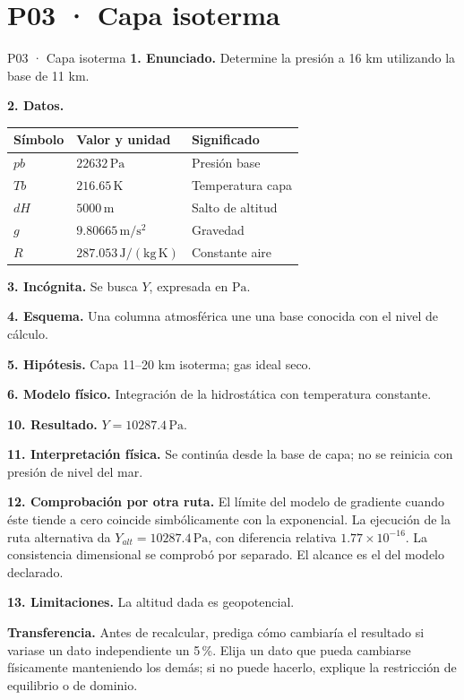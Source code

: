 \chapter*{P03 · Capa isoterma}
\begin{studiumworked}{P03 · Capa isoterma}
\textbf{1. Enunciado.} Determine la presión a 16 km utilizando la base de 11 km.

\textbf{2. Datos.}
\begin{longtable}{p{.16\linewidth}p{.35\linewidth}p{.38\linewidth}}\toprule Símbolo & Valor y unidad & Significado\\\midrule\endhead
$pb$ & $22632\,\mathrm{Pa}$ & Presión base\\
$Tb$ & $216.65\,\mathrm K$ & Temperatura capa\\
$dH$ & $5000\,\mathrm m$ & Salto de altitud\\
$g$ & $9.80665\,\mathrm{m/s^2}$ & Gravedad\\
$R$ & $287.053\,\mathrm{J/(kg\,K)}$ & Constante aire\\
\bottomrule\end{longtable}
\textbf{3. Incógnita.} Se busca $Y$, expresada en $\mathrm{Pa}$.

\textbf{4. Esquema.} Una columna atmosférica une una base conocida con el nivel de cálculo.

\textbf{5. Hipótesis.} Capa 11–20 km isoterma; gas ideal seco.

\textbf{6. Modelo físico.} Integración de la hidrostática con temperatura constante.


\textbf{10. Resultado.} $Y=10287.4\,\mathrm{Pa}$.

\textbf{11. Interpretación física.} Se continúa desde la base de capa; no se reinicia con presión de nivel del mar.

\textbf{12. Comprobación por otra ruta.} El límite del modelo de gradiente cuando éste tiende a cero coincide simbólicamente con la exponencial. La ejecución de la ruta alternativa da $Y_{alt}=10287.4\,\mathrm{Pa}$, con diferencia relativa $1.77\times10^{-16}$. La consistencia dimensional se comprobó por separado. El alcance es el del modelo declarado.

\textbf{13. Limitaciones.} La altitud dada es geopotencial.

\textbf{Transferencia.} Antes de recalcular, prediga cómo cambiaría el resultado si variase un dato independiente un 5\,\%. Elija un dato que pueda cambiarse físicamente manteniendo los demás; si no puede hacerlo, explique la restricción de equilibrio o de dominio.\par
\end{studiumworked}
